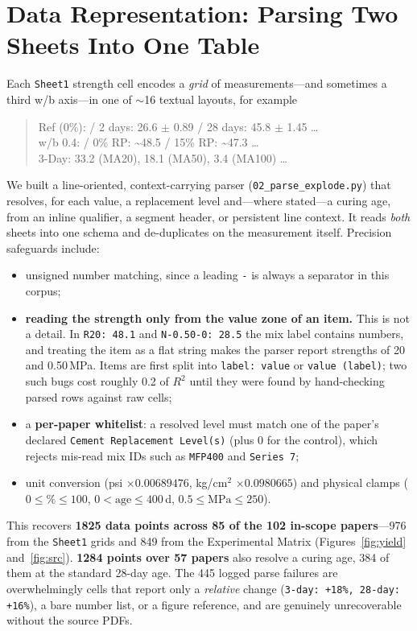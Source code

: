 \documentclass[11pt]{article}
\newcommand{\R}{$R^2$}
\begin{document}
\section{Data Representation: Parsing Two Sheets Into One Table}
\label{sec:parse}
Each \texttt{Sheet1} strength cell encodes a \emph{grid} of measurements---and
sometimes a third w/b axis---in one of $\sim$16 textual layouts, for example
\begin{quote}\small\ttfamily
Ref (0\%): / 2 days: 26.6 $\pm$ 0.89 / 28 days: 45.8 $\pm$ 1.45 \dots\\
w/b 0.4: / 0\% RP: \~{}48.5 / 15\% RP: \~{}47.3 \dots\\
3-Day: 33.2 (MA20), 18.1 (MA50), 3.4 (MA100) \dots
\end{quote}
We built a line-oriented, context-carrying parser
(\texttt{02\_parse\_explode.py}) that resolves, for each value, a replacement level
and---where stated---a curing age, from an inline qualifier, a segment header, or
persistent line context. It reads \emph{both} sheets into one schema and
de-duplicates on the measurement itself. Precision safeguards include:
\begin{itemize}\itemsep2pt
  \item unsigned number matching, since a leading \texttt{-} is always a separator
        in this corpus;
  \item \textbf{reading the strength only from the value zone of an item.} This is
        not a detail. In \texttt{R20: 48.1} and \texttt{N-0.50-0: 28.5} the mix
        label contains numbers, and treating the item as a flat string makes the
        parser report strengths of 20 and 0.50\,MPa. Items are first split into
        \texttt{label: value} or \texttt{value (label)}; two such bugs cost roughly
        0.2 of \R{} until they were found by hand-checking parsed rows against raw
        cells;
  \item a \textbf{per-paper whitelist}: a resolved level must match one of the
        paper's declared \texttt{Cement Replacement Level(s)} (plus 0 for the
        control), which rejects mis-read mix IDs such as \texttt{MFP400} and
        \texttt{Series 7};
  \item unit conversion (psi $\times0.00689476$, kg/cm$^2$ $\times0.0980665$) and
        physical clamps ($0\le\%\le100$, $0<\text{age}\le400$\,d,
        $0.5\le\text{MPa}\le250$).
\end{itemize}

This recovers \textbf{1825 data points across 85 of the 102 in-scope papers}---976
from the \texttt{Sheet1} grids and 849 from the Experimental Matrix
(Figures~\ref{fig:yield} and~\ref{fig:src}). \textbf{1284 points over 57 papers}
also resolve a curing age, 384 of them at the standard 28-day age. The 445 logged
parse failures are
overwhelmingly cells that report only a \emph{relative} change
(\texttt{3-day: +18\%, 28-day: +16\%}), a bare number list, or a figure reference,
and are genuinely unrecoverable without the source PDFs.
\end{document}

